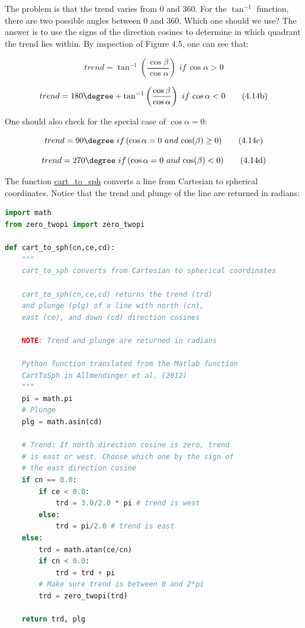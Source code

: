 \documentclass[a4paper , 12pt]{book}
\begin{document}
The problem is that the trend varies from 0 and 360\degree. For the $\tan^{-1}$ function, there are two possible angles between 0 and 360\degree. Which one should we use? The answer is to use the signs of the direction cosines to determine in which quadrant the trend lies within. By inspection of Figure 4.5, one can see that:

\begin{equation}
    trend = \tan^{-1}\left(\frac{\cos\beta}{\cos\alpha}\right)\,\,if\,\cos\alpha>0 \tag{4.14a}
\end{equation}

\begin{equation}
    trend = 180\degree+\tan^{-1}\left(\frac{\cos\beta}{\cos\alpha}\right)\,\,if\,\cos\alpha<0 \tag{4.14b}
\end{equation}

One should also check for the special case of $\cos\alpha=0$:

\begin{equation}
    trend = 90\degree\,\,if\,(\cos\alpha = 0\,\,and\,\cos(\beta)\geq 0) \tag{4.14c}
\end{equation}

\begin{equation}
    trend = 270\degree\,\,if\,(\cos\alpha = 0\,\,and\,\cos(\beta)< 0) \tag{4.14d}
\end{equation}

The function \href{https://github.com/nfcd/compGeo/blob/master/source/functions/cart_to_sph.py}{cart\_to\_sph} converts a line from Cartesian to spherical coordinates. Notice that the trend and plunge of the line are returned in radians:

\begin{center}
\begin{lstlisting}[language=Python, frame=single]
import math
from zero_twopi import zero_twopi

def cart_to_sph(cn,ce,cd):
	"""
	cart_to_sph converts from Cartesian to spherical coordinates
	
	cart_to_sph(cn,ce,cd) returns the trend (trd)
	and plunge (plg) of a line with north (cn),
	east (ce), and down (cd) direction cosines
	
	NOTE: Trend and plunge are returned in radians
	
	Python function translated from the Matlab function
	CartToSph in Allmendinger et al. (2012)
	"""
	pi = math.pi
	# Plunge 
	plg = math.asin(cd) 
	
	# Trend: If north direction cosine is zero, trend
	# is east or west. Choose which one by the sign of
	# the east direction cosine
	if cn == 0.0:
		if ce < 0.0:
			trd = 3.0/2.0 * pi # trend is west
		else:
			trd = pi/2.0 # trend is east
	else:
		trd = math.atan(ce/cn) 
		if cn < 0.0:
			trd = trd + pi 
		# Make sure trend is between 0 and 2*pi
		trd = zero_twopi(trd)
	
	return trd, plg
\end{lstlisting}    
\end{center}
\end{document}
